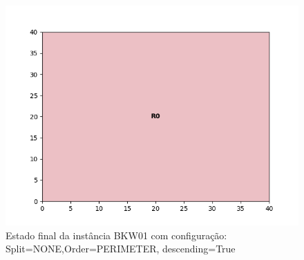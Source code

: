 \begin{figure}[H]
    \centering
    \caption[]{Estado final da instância BKW01 com configuração: Split=NONE,Order=PERIMETER, descending=True}
    \label{fig:bkw01-none-perimeter-true}
    \includegraphics[scale=0.5]{output/figures/bkw/bkw01/none/perimeter/true/00}
\end{figure}